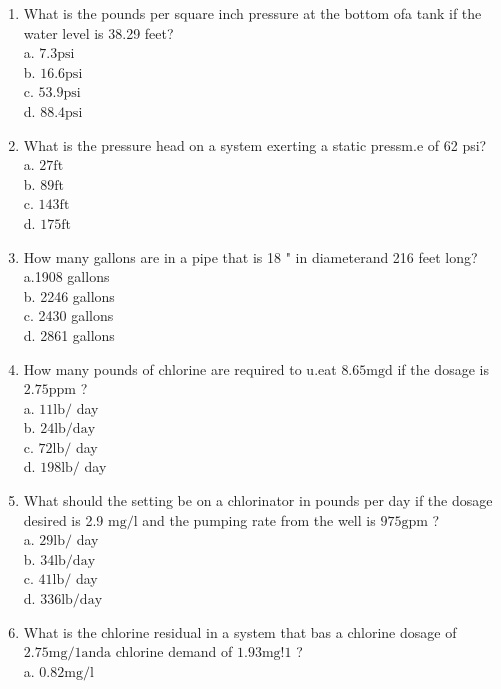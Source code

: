 \begin{enumerate}
\item What is the pounds per square inch pressure at the bottom ofa tank if the water level is 38.29 feet?\\
a. $7.3 \mathrm{psi}$\\
b. $16.6 \mathrm{psi}$\\
c. $53.9 \mathrm{psi}$\\
d. $88.4 \mathrm{psi}$\\
\item What is the pressure head on a system exerting a static pressm.e of 62 psi?\\
a. $27 \mathrm{ft}$\\
b. $89 \mathrm{ft}$\\
c. $143 \mathrm{ft}$\\
d. $175 \mathrm{ft}$\\
\item How many gallons are in a pipe that is 18 " in diameterand 216 feet long?\\
a.1908 gallons\\
b. 2246 gallons\\
c. 2430 gallons\\
d. 2861 gallons\\
\item How many pounds of chlorine are required to u.eat $8.65 \mathrm{mgd}$ if the dosage is $2.75 \mathrm{ppm}$ ?\\
a. $11 \mathrm{lb} /$ day\\
b. $24 \mathrm{lb} / \mathrm{day}$\\
c. $72 \mathrm{lb} /$ day\\
d. $198 \mathrm{lb} /$ day\\
\item What should the setting be on a chlorinator in pounds per day if the dosage desired is 2.9 $\mathrm{mg} / \mathrm{l}$ and the pumping rate from the well is $975 \mathrm{gpm}$ ?\\
a. $29 \mathrm{lb} /$ day\\
b. $34 \mathrm{lb} / \mathrm{day}$\\
c. $41 \mathrm{lb} /$ day\\
d. $336 \mathrm{lb} / \mathrm{day}$\\
\item What is the chlorine residual in a system that bas a chlorine dosage of $2.75 \mathrm{mg} / 1 \mathrm{and} \mathrm{a}$ chlorine demand of $1.93 \mathrm{mg} ! 1$ ?\\
a. $0.82 \mathrm{mg} / \mathrm{l}$\\

\end{enumerate}
